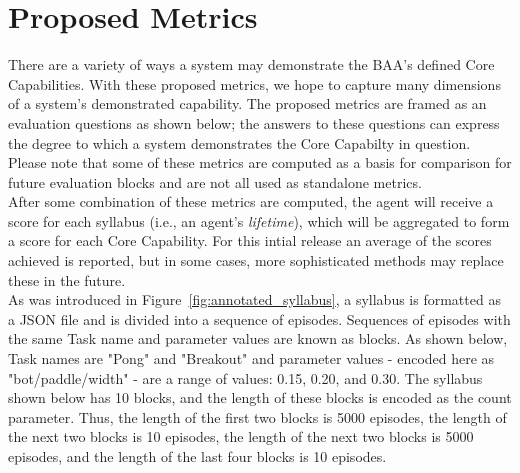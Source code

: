 \chapter{Proposed Metrics}\label{ch:metrics_syllabus}

There are a variety of ways a system may demonstrate the BAA's defined Core Capabilities. With these proposed metrics, we hope to capture many dimensions of a system's demonstrated capability. The proposed metrics are framed as an evaluation questions as shown below; the answers to these questions can express the degree to which a system demonstrates the Core Capabilty in question. Please note that some of these metrics are computed as a basis for comparison for future evaluation blocks and are not all used as standalone metrics. \\[0.1in]

After some combination of these metrics are computed, the agent will receive a score for each syllabus (i.e., an agent's \textit{lifetime}), which will be aggregated to form a score for each Core Capability. For this intial release an average of the scores achieved is reported, but in some cases, more sophisticated methods may replace these in the future.\\[0.2in]

As was introduced in Figure~\ref{fig:annotated_syllabus}, a syllabus is formatted as a JSON file and is divided into a sequence of episodes. Sequences of episodes with the same Task name and parameter values are known as blocks. As shown below, Task names are "Pong" and "Breakout" and parameter values - encoded here as "bot/paddle/width" - are a range of values: 0.15, 0.20, and 0.30. The syllabus shown below has 10 blocks, and the length of these blocks is encoded as the count parameter. Thus, the length of the first two blocks is 5000 episodes, the length of the next two blocks is 10 episodes, the length of the next two blocks is 5000 episodes, and the length of the last four blocks is 10 episodes.

